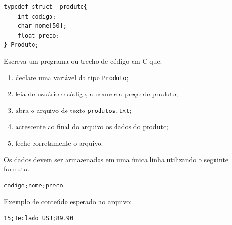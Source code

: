 \documentclass[12pt,a4paper]{article}
\begin{document}
\begin{lstlisting}
typedef struct _produto{
    int codigo;
    char nome[50];
    float preco;
} Produto;
\end{lstlisting}

Escreva um programa ou trecho de código em C que:

\begin{enumerate}
    \item declare uma variável do tipo \texttt{Produto};
    \item leia do usuário o código, o nome e o preço do produto;
    \item abra o arquivo de texto \texttt{produtos.txt};
    \item acrescente ao final do arquivo os dados do produto;
    \item feche corretamente o arquivo.
\end{enumerate}

Os dados devem ser armazenados em uma única linha utilizando o seguinte
formato:

\begin{verbatim}
codigo;nome;preco
\end{verbatim}

Exemplo de conteúdo esperado no arquivo:

\begin{verbatim}
15;Teclado USB;89.90
\end{verbatim}

\end{document}
